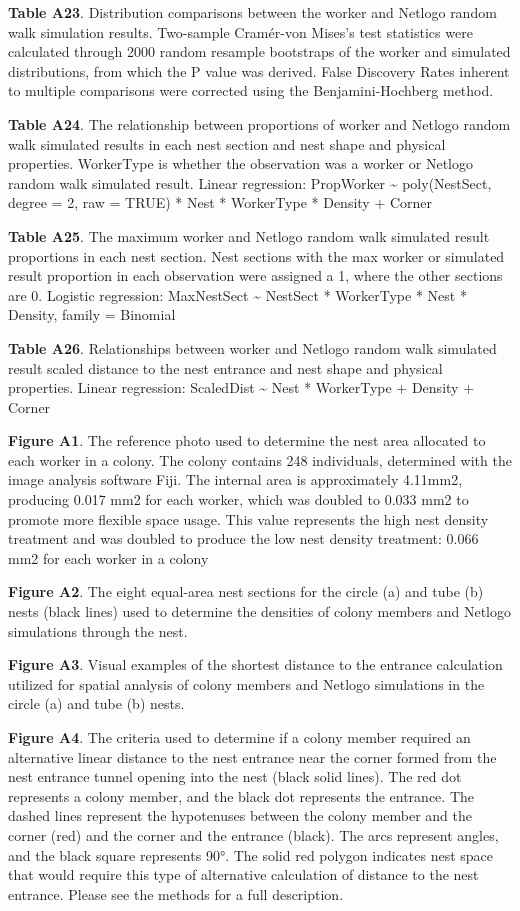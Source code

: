 \documentclass[3p]{elsarticle} %
\begin{document}
\textbf{Table A23}. Distribution comparisons between the worker and
Netlogo random walk simulation results. Two-sample Cramér-von Mises's
test statistics were calculated through 2000 random resample bootstraps
of the worker and simulated distributions, from which the P value was
derived. False Discovery Rates inherent to multiple comparisons were
corrected using the Benjamini-Hochberg method.

\textbf{Table A24}. The relationship between proportions of worker and
Netlogo random walk simulated results in each nest section and nest
shape and physical properties. WorkerType is whether the observation was
a worker or Netlogo random walk simulated result. Linear regression:
PropWorker \textasciitilde{} poly(NestSect, degree = 2, raw = TRUE) *
Nest * WorkerType * Density + Corner

\textbf{Table A25}. The maximum worker and Netlogo random walk simulated
result proportions in each nest section. Nest sections with the max
worker or simulated result proportion in each observation were assigned
a 1, where the other sections are 0. Logistic regression: MaxNestSect
\textasciitilde{} NestSect * WorkerType * Nest * Density, family =
Binomial

\textbf{Table A26}. Relationships between worker and Netlogo random walk
simulated result scaled distance to the nest entrance and nest shape and
physical properties. Linear regression: ScaledDist \textasciitilde{}
Nest * WorkerType + Density + Corner

\textbf{Figure A1}. The reference photo used to determine the nest area
allocated to each worker in a colony. The colony contains 248
individuals, determined with the image analysis software Fiji. The
internal area is approximately 4.11mm2, producing 0.017 mm2 for each
worker, which was doubled to 0.033 mm2 to promote more flexible space
usage. This value represents the high nest density treatment and was
doubled to produce the low nest density treatment: 0.066 mm2 for each
worker in a colony

\textbf{Figure A2}. The eight equal-area nest sections for the circle
(a) and tube (b) nests (black lines) used to determine the densities of
colony members and Netlogo simulations through the nest.

\textbf{Figure A3}. Visual examples of the shortest distance to the
entrance calculation utilized for spatial analysis of colony members and
Netlogo simulations in the circle (a) and tube (b) nests.

\textbf{Figure A4}. The criteria used to determine if a colony member
required an alternative linear distance to the nest entrance near the
corner formed from the nest entrance tunnel opening into the nest (black
solid lines). The red dot represents a colony member, and the black dot
represents the entrance. The dashed lines represent the hypotenuses
between the colony member and the corner (red) and the corner and the
entrance (black). The arcs represent angles, and the black square
represents 90°. The solid red polygon indicates nest space that would
require this type of alternative calculation of distance to the nest
entrance. Please see the methods for a full description.
\end{document}
